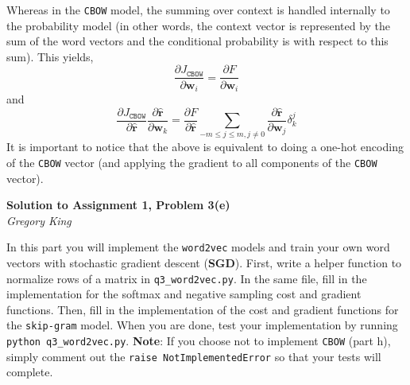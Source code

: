 \documentclass[letter,12pt]{article}
\newcommand{\myhwtitle}[3]
{\begin{center}
{\large {\bf Solution to Assignment {#1}, Problem {#2}}}\\
\medskip
{\it {#3}} %
\end{center}}
\newcommand{\solutionsAuthor}{Gregory King}
\begin{document}
\noindent Whereas in the \texttt{CBOW} model, the summing over context is handled internally to the probability model (in other words, the context vector is represented by the sum of the word vectors and the conditional probability is with respect to this sum). This yields,
\begin{equation}
\frac{\partial J_{\texttt{CBOW}}}{\partial{\boldsymbol w}_{i}} = \frac{\partial{F}}{\partial{\boldsymbol w}_{i}}
\end{equation}
and
\begin{equation}
\frac{\partial J_{\texttt{CBOW}}}{\partial{\hat{\boldsymbol r}}}\frac{\partial{\hat{\boldsymbol r}}}{\partial{\boldsymbol w}_{k}} = \frac{\partial{F}}{\partial{\hat{\boldsymbol r}}} \sum_{-m\le j\le m, j\neq0} \frac{\partial{\hat{\boldsymbol r}}}{\partial{\boldsymbol w}_{j}}\delta^{j}_{k}
\end{equation}
It is important to notice that the above is equivalent to doing a one-hot encoding of the \texttt{CBOW} vector (and applying the gradient to all components of the \texttt{CBOW} vector).
%

\clearpage
\myhwtitle{1}{3(e)}{\solutionsAuthor}
\bigskip
\noindent In this part you will implement the \texttt{word2vec} models and train your own word vectors with stochastic gradient descent (\textbf{SGD}). First,
write a helper function to normalize rows of a matrix in \texttt{q3\_word2vec.py}. In the same file, fill in the implementation for the softmax and negative sampling
cost and gradient functions. Then, fill in the implementation of the cost and gradient functions for the \texttt{skip-gram} model. When you are done, test your implementation
by running \texttt{python q3\_word2vec.py}. \textbf{Note}: If you choose not to implement \texttt{CBOW} (part h), simply comment out the \texttt{raise NotImplementedError}
so that your tests will complete.\vspace{5mm}
\end{document}
